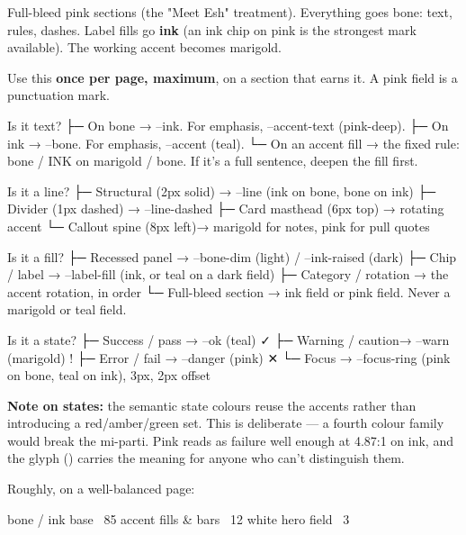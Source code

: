 \documentclass[fontpath=fonts/,logopath=logo/]{riposte-doc}
\begin{document}
Full-bleed pink sections (the "Meet Esh" treatment). Everything goes bone: text, rules, dashes. Label fills go \textbf{ink} (an ink chip on pink is the strongest mark available). The working accent becomes marigold.

Use this \textbf{once per page, maximum}, on a section that earns it. A pink field is a punctuation mark.



\ripcodeopen
{}
\begin{ripcodeblock}
Is it text?
├─ On bone  → --ink. For emphasis, --accent-text (pink-deep).
├─ On ink   → --bone. For emphasis, --accent (teal).
└─ On an accent fill → the fixed rule: bone / INK on marigold / bone.
                       If it's a full sentence, deepen the fill first.

Is it a line?
├─ Structural (2px solid)  → --line  (ink on bone, bone on ink)
├─ Divider (1px dashed)    → --line-dashed
├─ Card masthead (6px top) → rotating accent
└─ Callout spine (8px left)→ marigold for notes, pink for pull quotes

Is it a fill?
├─ Recessed panel      → --bone-dim (light) / --ink-raised (dark)
├─ Chip / label        → --label-fill (ink, or teal on a dark field)
├─ Category / rotation → the accent rotation, in order
└─ Full-bleed section  → ink field or pink field. Never a marigold or teal field.

Is it a state?
├─ Success / pass   → --ok      (teal)  ✓
├─ Warning / caution→ --warn    (marigold) !
├─ Error / fail     → --danger  (pink)  ✕
└─ Focus            → --focus-ring (pink on bone, teal on ink), 3px, 2px offset
\end{ripcodeblock}
\ripcodesizereset\ripcodeclose

\textbf{Note on states:} the semantic state colours reuse the accents rather than introducing a red/amber/green set. This is deliberate — a fourth colour family would break the mi-parti. Pink reads as failure well enough at 4.87:1 on ink, and the glyph () carries the meaning for anyone who can't distinguish them.



Roughly, on a well-balanced page:

\ripcodeopen
{}
\begin{ripcodeblock}
bone / ink base        ~85%
accent fills & bars    ~12%
white hero field        ~3%
\end{ripcodeblock}
\ripcodesizereset\ripcodeclose
\end{document}
